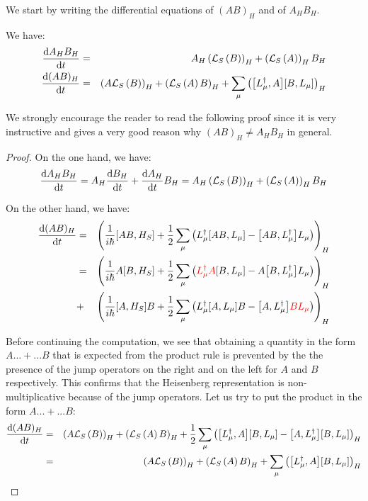 We start by writing the differential equations of $(A B)_H$ and of $A_H B_H$.
\begin{theorem}
    We have:
    \begin{eqnarray} \label{eq-diff-a-b}
        \timeDeriv{A_H B_H} &=& A_H \heis{\LS{B}} + \heis{\LS{A}} B_H\\ \label{eq-diff-(ab)}
        \timeDeriv{(A B)_H} &=& \heis{A \LS{B}} + \heis{\LS{A} B} + \sum_\mu \heis{\commutator{L^\dagger_\mu}{A} \commutator{B}{L_\mu}}
    \end{eqnarray}
\end{theorem}
We strongly encourage the reader to read the following proof since it is very instructive and gives a very good reason why $(A B)_H \neq A_H B_H$ in general.
\begin{proof}
On the one hand, we have:
\begin{equation}
    \dv{A_H B_H}{t} = A_H \dv{B_H}{t} + \dv{A_H}{t} B_H = A_H \left(\mathcal{L}_S\left(B\right)\right)_H + \left(\mathcal{L}_S\left(A\right)\right)_H B_H
\end{equation}

On the other hand, we have:
\begin{eqnarray}
    \timeDeriv{(A B)_H} &=& \heis{\ihbar \commutator{A B}{H_S} + \frac{1}{2} \sum_\mu \left( L^\dagger_\mu \commutator{A B}{L_\mu}  - \commutator{A B}{L^\dagger_\mu} L_\mu \right)}\nonumber\\
    &=& \heis{\ihbar A \commutator{B}{H_S} + \frac{1}{2} \sum_\mu \left(\color{red} L^\dagger_\mu A \color{black} \commutator{B}{L_\mu}  - A \commutator{B}{L^\dagger_\mu} L_\mu \right)}\nonumber\\
    &+& \heis{\ihbar \commutator{A}{H_S} B + \frac{1}{2} \sum_\mu \left( L^\dagger_\mu \commutator{A}{L_\mu} B  - \commutator{A}{L^\dagger_\mu} \color{red} B L_\mu \color{black} \right)}
\end{eqnarray}

Before continuing the computation, we see that obtaining a quantity in the form $A ... + ... B$ that is expected from the product rule is prevented by the the presence of the jump operators on the right and on the left for $A$ and $B$ respectively. This confirms that the Heisenberg representation is non-multiplicative because of the jump operators. Let us try to put the product in the form $A ... + ... B$:
\begin{eqnarray}
    \timeDeriv{(A B)_H} &=& \heis{A \LS{B}} + \heis{\LS{A} B} + \frac{1}{2} \sum_\mu \heis{\commutator{L^\dagger_\mu}{A} \commutator{B}{L_\mu} - \commutator{A}{L^\dagger_\mu} \commutator{B}{L_\mu}}\nonumber\\
    &=& \heis{A \LS{B}} + \heis{\LS{A} B} + \sum_\mu \heis{\commutator{L^\dagger_\mu}{A} \commutator{B}{L_\mu}}
\end{eqnarray}
\end{proof}

